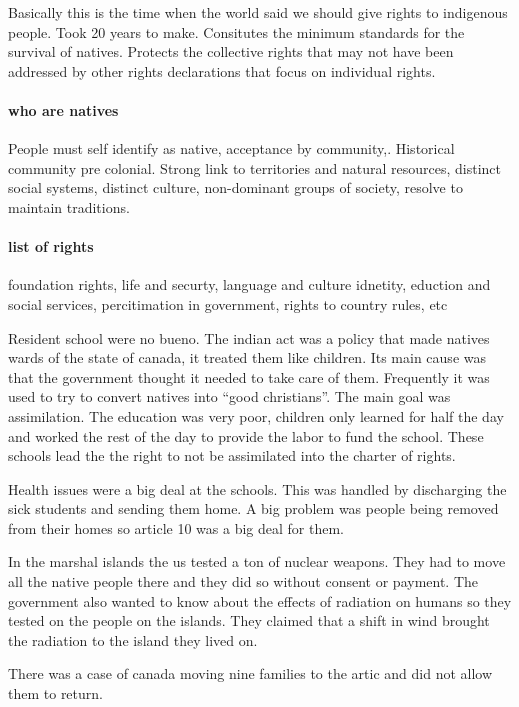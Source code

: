 \documentclass{article}
\begin{document}
Basically this is the time when the world said we should give rights to indigenous people. Took 20 years to make. Consitutes the minimum standards for the survival of natives. Protects the collective rights that may not have been addressed by other rights declarations that focus on individual rights.

\paragraph{who are natives}
\label{par:who_are_natives}
People must self identify as native, acceptance by community,. Historical community pre colonial. Strong link to territories and natural resources, distinct social systems, distinct culture, non-dominant groups of society, resolve to maintain traditions.

\paragraph{list of rights}
\label{par:list_of_rights}
foundation rights, life and securty, language and culture idnetity, eduction and social services, percitimation in government, rights to country rules, etc

Resident school were no bueno. The indian act was a policy that made natives wards of the state of canada, it treated them like children. Its main cause was that the government thought it needed to take care of them. Frequently it was used to try to convert natives into ``good christians''. The main goal was assimilation. The education was very poor, children only learned for half the day and worked the rest of the day to provide the labor to fund the school. These schools lead the the right to not be assimilated into the charter of rights.

Health issues were a big deal at the schools. This was handled by discharging the sick students and sending them home. A big problem was people being removed from their homes so article 10 was a big deal for them.

In the marshal islands the us tested a ton of nuclear weapons. They had to move all the native people there and they did so without consent or payment. The government also wanted to know about the effects of radiation on humans so they tested on the people on the islands. They claimed that a shift in wind brought the radiation to the island they lived on.

There was a case of canada moving nine families to the artic and did not allow them to return.
\end{document}
